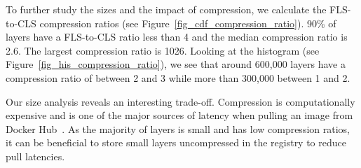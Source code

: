 To further study the sizes and the impact of compression, we calculate
the FLS-to-CLS compression ratios (see Figure~\ref{fig_cdf_compression_ratio}).
%
%
90\% of layers have a  FLS-to-CLS ratio less than 4 and the median
compression ratio is 2.6. The largest compression ratio is 1026.
%
%
%
%
Looking at the histogram (see Figure~\ref{fig_his_compression_ratio}), we see
that around 600,000 layers have a compression ratio of between 2 and 3 while more than
300,000 between 1 and 2.
%

Our size analysis reveals an interesting trade-off. Compression is computationally
expensive and is one of the major sources of latency when pulling an image from Docker Hub~\cite{slacker}.
As the majority of layers is small and has low compression ratios, it can
be beneficial to store small layers uncompressed in the registry to reduce pull latencies.


